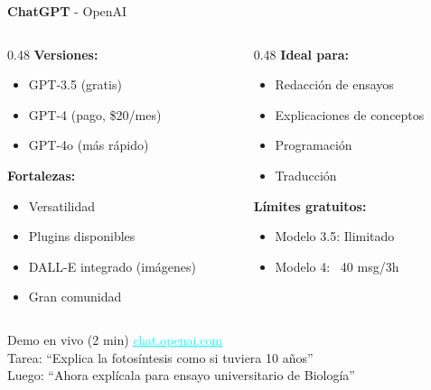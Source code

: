 \documentclass[aspectratio=169,xcolor={dvipsnames}]{beamer}
\newcommand{\herramienta}[1]{\textbf{\textcolor{naranjaUNSCH}{#1}}}
\newcommand{\enlace}[2]{\href{#1}{\textcolor{cyan}{\underline{#2}}}}
\begin{document}
	\begin{frame}{\herramienta{ChatGPT} - OpenAI}
		
		\begin{columns}[T]
			\begin{column}{0.48\textwidth}
				\textbf{Versiones:}
				\begin{itemize}
					\item GPT-3.5 (gratis)
					\item GPT-4 (pago, \$20/mes)
					\item GPT-4o (más rápido)
				\end{itemize}
				
				\vspace{0.3cm}
				
				\textbf{Fortalezas:}
				\begin{itemize}
					\item Versatilidad
					\item Plugins disponibles
					\item DALL-E integrado (imágenes)
					\item Gran comunidad
				\end{itemize}
			\end{column}
			
			\begin{column}{0.48\textwidth}
				\textbf{Ideal para:}
				\begin{itemize}
					\item Redacción de ensayos
					\item Explicaciones de conceptos
					\item Programación
					\item Traducción
				\end{itemize}
				
				\vspace{0.3cm}
				
				\textbf{Límites gratuitos:}
				\begin{itemize}
					\item Modelo 3.5: Ilimitado
					\item Modelo 4: ~40 msg/3h
				\end{itemize}
			\end{column}
		\end{columns}
		
		\vspace{0.5cm}
		
		\begin{exampleblock}{Demo en vivo (2 min)}
			\enlace{https://chat.openai.com}{chat.openai.com}\\
			Tarea: ``Explica la fotosíntesis como si tuviera 10 años''\\
			Luego: ``Ahora explícala para ensayo universitario de Biología''
		\end{exampleblock}
		
	\end{frame}
	
\end{document}
